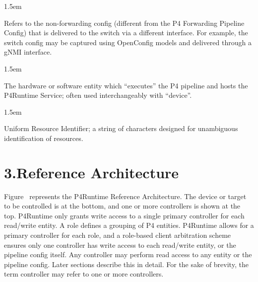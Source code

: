 \documentclass[11pt]{article}
\begin{document}
{\begin{mddefinitions}

\begin{mdbmarginx}{}{}{}{1.5em}%
\begin{mddefdata}%
Refers to the non-forwarding config (different from the P4 Forwarding
Pipeline Config) that is delivered to the switch via a different
interface. For example, the switch config may be captured using OpenConfig
models and delivered through a gNMI interface.
\end{mddefdata}%
\end{mdbmarginx}%


\begin{mdbmarginx}{}{}{}{1.5em}%
\begin{mddefdata}%
The hardware or software entity which \textquotedblleft{}executes\textquotedblright{} the P4 pipeline and hosts
the P4Runtime Service; often used interchangeably with \textquotedblleft{}device\textquotedblright{}.
\end{mddefdata}%
\end{mdbmarginx}%


\begin{mdbmarginx}{}{}{}{1.5em}%
\begin{mddefdata}%
Uniform Resource Identifier; a string of characters designed for unambiguous
identification of resources.%
\end{mddefdata}%
\end{mdbmarginx}%
\end{mddefinitions}%

\section{3.\hspace*{0.5em}Reference Architecture}\label{sec-reference-architecture}%

\noindent{}Figure~ represents the P4Runtime Reference
Architecture. The device or target to be controlled is at the bottom, and one or
more controllers is shown at the top. P4Runtime only grants write access to a
single primary controller for each read/write entity. A role defines a grouping
of P4 entities. P4Runtime allows for a primary controller for each role, and a
role-based client arbitration scheme ensures only one controller has
write access to each read/write entity, or the pipeline config itself. Any
controller may perform read access to any entity or the pipeline config. Later
sections describe this in detail. For the sake of brevity, the term controller
may refer to one or more controllers.%

}
\end{document}
